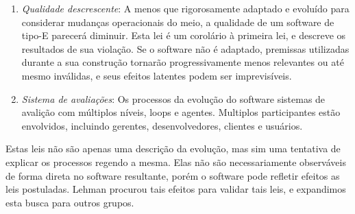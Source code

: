 \begin{enumerate}
	\item \textit{Qualidade descrescente}: A menos que rigorosamente adaptado e evoluído para considerar mudanças operacionais do meio, a qualidade de um software de tipo-E parecerá diminuir. Esta lei é um corolário à primeira lei, e descreve os resultados de sua violação. Se o software não é adaptado, premissas utilizadas durante a sua construção tornarão progressivamente menos relevantes ou até mesmo inválidas, e seus efeitos latentes podem ser imprevisíveis.
	\item \textit{Sistema de avaliações}: Os processos da evolução do software sistemas de avalição com múltiplos níveis, loops e agentes. Multiplos participantes estão envolvidos, incluindo gerentes, desenvolvedores, clientes e usuários. 
\end{enumerate}

Estas leis não são apenas uma descrição da evolução, mas sim uma tentativa de explicar os processos regendo a mesma. Elas não são necessariamente observáveis de forma direta no software resultante, porém o software pode refletir efeitos as leis postuladas. Lehman procurou tais efeitos para validar tais leis, e expandimos esta busca para outros grupos.

